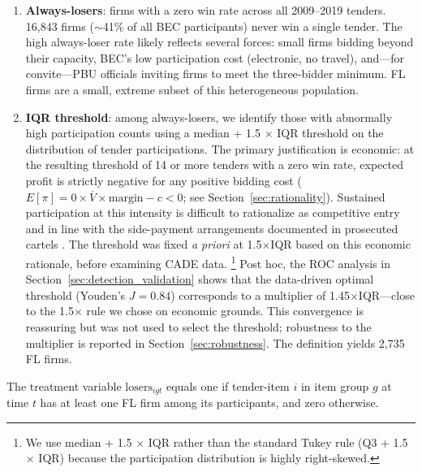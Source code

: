 \begin{enumerate}
  \item \textbf{Always-losers}: firms with a zero win rate across all
    2009--2019 tenders. 16,843 firms ($\sim$41\% of all
    BEC participants) never win a single tender. The high always-loser
    rate likely reflects several forces: small firms bidding beyond
    their capacity, BEC's low participation cost (electronic,
    no travel), and---for convite---PBU officials inviting firms to
    meet the three-bidder minimum. FL firms are a small, extreme
    subset of this heterogeneous population.
  \item \textbf{IQR threshold}: among always-losers, we identify those
    with abnormally high participation counts using a median + 1.5
    $\times$ IQR threshold on the distribution of tender
    participations. The primary justification is economic: at the
    resulting threshold of 14 or more tenders with a zero win rate,
    expected profit is strictly negative for any positive bidding cost
    ($E[\pi] = 0 \times \overline{V} \times \text{margin} - c < 0$;
    see Section~\ref{sec:rationality}). Sustained participation at this
    intensity is difficult to rationalize as competitive entry and
    in line with the side-payment arrangements documented in prosecuted
    cartels \citep{asker2010leniency, marshall2012economics}. The
    threshold was fixed \emph{a priori} at 1.5$\times$IQR based on
    this economic rationale, before examining CADE data.%
    \footnote{We use median + 1.5 $\times$ IQR rather than the standard
    Tukey rule (Q3 + 1.5 $\times$ IQR) because the participation
    distribution is highly right-skewed.}
    Post hoc, the ROC analysis in
    Section~\ref{sec:detection_validation} shows that the
    data-driven optimal threshold (Youden's $J = 0.84$) corresponds
    to a multiplier of 1.45$\times$IQR---close to the 1.5$\times$
    rule we chose on economic grounds. This convergence is reassuring
    but was not used to select the threshold; robustness to the
    multiplier is reported in Section~\ref{sec:robustness}.
    The definition yields 2,735 FL firms.
\end{enumerate}

The treatment variable $\text{losers}_{igt}$ equals one if tender-item
$i$ in item group $g$ at time $t$ has at least one FL firm among its
participants, and zero otherwise.

